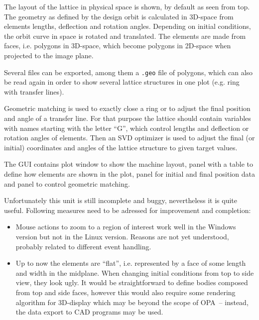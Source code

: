 \documentclass[12pt]{article}
\newcommand\code[1]{{\tt #1}}
\newcommand\guico[1]{{\color{blue}\code{#1}}}
\newcommand{\desc}[1]{#1}
\newcommand{\todo}[1]{{\color{red} #1}}
\begin{document}
\desc{
The layout of the lattice in physical space is shown, by default as seen from top. The geometry as defined by the design orbit is calculated in 3D-space from elements lengths, deflection and rotation angles. Depending on initial conditions, the orbit curve in space is rotated and translated. The elements are made from faces, i.e. polygons in 3D-space, which become polygons in 2D-space when projected to the image plane.

Several files can be exported, among them a \code{.geo} file of polygons, which can also be read again in order to show several lattice structures in one plot (e.g. ring with transfer lines).

Geometric matching is used to exactly close a ring or to adjust the final position and angle of a transfer line. For that purpose the lattice should contain variables with names starting with the letter ``G'', which control lengths and deflection or rotation angles of elements. Then an SVD optimizer is used to adjust the final (or initial) coordinates and angles of the lattice structure to given target values.

The GUI contains plot window \guico{geo} to show the machine layout, panel \guico{PanParam} with a table to define how elements are shown in the plot, panel \guico{PanGeo} for initial and final position data and panel \guico{PanMat} to control geometric matching.

\todo{Unfortunately this unit is still incomplete and buggy, nevertheless it is quite useful. Following measures need to be adressed for improvement and completion:
\begin{itemize}
\item Mouse actions to zoom to a region of interest work well in the Windows version but not in the Linux version. Reasons are not yet understood, probably related to different event handling.
\item Up to now the elements are ``flat'', i.e. represented by a face of some length and width in the midplane. When changing initial conditions from top to side view, they look ugly. It would be straightforward to define bodies composed from top and side faces, however this would also require some rendering algorithm for 3D-display which may be beyond the scope of OPA~-- instead, the data export to CAD programs may be used.
\end{itemize}
}
}
\end{document}
